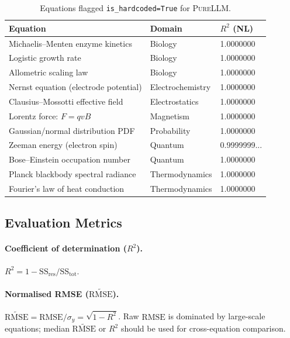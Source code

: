 \documentclass[twoside,11pt]{article}
\newcommand{\PureLLM}{\textsc{PureLLM}}
\newcommand{\Rsq}{R^{2}}
\newcommand{\rmse}{\ensuremath{\mathrm{RMSE}}}
\newcommand{\nrmse}{\ensuremath{\widetilde{\mathrm{RMSE}}}}
\begin{document}
\begin{table}[ht]
\centering
\caption{Equations flagged \texttt{is\_hardcoded=True} for \PureLLM{}.}
\label{tab:hardcoded}
\small
\begin{tabular}{L{6.0cm} L{3.2cm} C{1.5cm}}
\toprule
\textbf{Equation} & \textbf{Domain} & \textbf{$\Rsq$ (NL)} \\
\midrule
Michaelis--Menten enzyme kinetics       & Biology          & 1.0000000 \\
Logistic growth rate                    & Biology          & 1.0000000 \\
Allometric scaling law                  & Biology          & 1.0000000 \\
Nernst equation (electrode potential)   & Electrochemistry & 1.0000000 \\
Clausius--Mossotti effective field      & Electrostatics   & 1.0000000 \\
Lorentz force: $F = qvB$                & Magnetism        & 1.0000000 \\
Gaussian/normal distribution PDF        & Probability      & 1.0000000 \\
Zeeman energy (electron spin)           & Quantum          & 0.9999999... \\
Bose--Einstein occupation number        & Quantum          & 1.0000000 \\
Planck blackbody spectral radiance      & Thermodynamics   & 1.0000000 \\
Fourier's law of heat conduction        & Thermodynamics   & 1.0000000 \\
\bottomrule
\end{tabular}
\end{table}

\subsection{Evaluation Metrics}
\label{sec:methods:metrics}

\paragraph{Coefficient of determination ($\Rsq$).}
$\Rsq = 1 - \mathrm{SS}_{\mathrm{res}} / \mathrm{SS}_{\mathrm{tot}}$.

\paragraph{Normalised RMSE ($\nrmse$).}
$\nrmse = \rmse/\sigma_y = \sqrt{1 - \Rsq}$.
Raw \rmse{} is dominated by large-scale equations; median \nrmse{} or $\Rsq$
should be used for cross-equation comparison.
\end{document}
